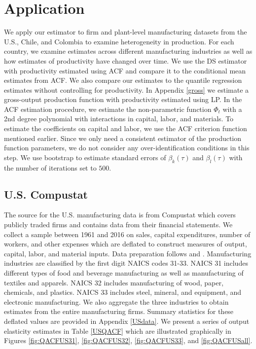 \documentclass[12pt]{article}
\begin{document}
\section{Application} \label{application}
We apply our estimator to firm and plant-level manufacturing datasets from the U.S., Chile, and Colombia to examine heterogeneity in production. For each country, we examine estimates across different manufacturing industries as well as how estimates of productivity have changed over time. We use the DS estimator with productivity estimated using ACF and compare it to the conditional mean estimates from ACF. We also compare our estimates to the quantile regression estimates without controlling for productivity. In Appendix \ref{gross} we estimate a gross-output production function with productivity estimated using LP. In the ACF estimation procedure, we estimate the non-parametric function $\Phi_{t}$ with a 2nd degree polynomial with interactions in capital, labor, and materials. To estimate the coefficients on capital and labor, we use the ACF criterion function mentioned earlier. Since we only need a consistent estimator of the production function parameters, we do not consider any over-identification conditions in this step. We use bootstrap to estimate standard errors of $\beta_{k}(\tau)$ and $\beta_{l}(\tau)$ with the number of iterations set to $500$.
\subsection{U.S. Compustat}
The source for the U.S. manufacturing data is from Compustat which covers publicly traded firms and contains data from their financial statements. We collect a sample between 1961 and 2016 on sales, capital expenditures, number of workers, and other expenses which are deflated to construct measures of output, capital, labor, and material inputs. Data preparation follows \cite{Keller2009} and \cite{mert}. Manufacturing industries are classified by the first digit NAICS codes 31-33. NAICS 31 includes different types of food and beverage manufacturing as well as manufacturing of textiles and apparels. NAICS 32 includes manufacturing of wood, paper, chemicals, and plastics. NAICS 33 includes steel, mineral, and equipment, and electronic manufacturing. We also aggregate the three industries to obtain estimates from the entire manufacturing firms. Summary statistics for these deflated values are provided in Appendix \ref{USdata}. We present a series of output elasticity estimates in Table \ref{USQACF} which are illustrated graphically in Figures \ref{fig:QACFUS31}, \ref{fig:QACFUS32}, \ref{fig:QACFUS33}, and \ref{fig:QACFUSall}. 
\end{document}
